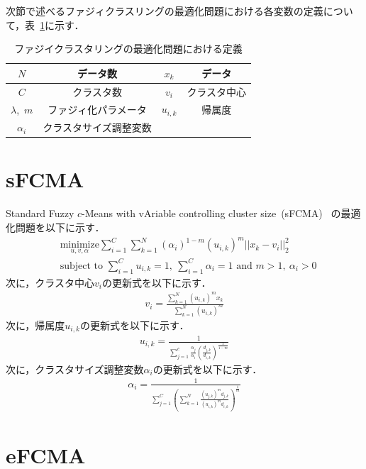 \documentclass[a4j,12pt,dvipdfmx,oneside]{jsbook}
\theoremstyle{definition}
\begin{document}
 次節で述べるファジィクラスリングの最適化問題における各変数の定義について，表~\ref{tab:fuzzy_c_define}に示す．
 \begin{table}[htbp]
  \caption{ファジイクラスタリングの最適化問題における定義}
  \begin{center}
   \begin{tabular}{c|c||c|c} \hline
    {$N$}&データ数&{$x_k$}&データ \\ \hline
    {$C$}&クラスタ数&{$v_i$}&クラスタ中心\\ \hline
    {$\lambda$,~$m$}&ファジィ化パラメータ&{$u_{i,k}$}&帰属度 \\ \hline
    {$\alpha_i$}&クラスタサイズ調整変数\\ \hline
   \end{tabular}
  \end{center}
  \label{tab:fuzzy_c_define}
 \end{table}

 \section{sFCMA}\label{sec:sfcma}
 
 Standard Fuzzy $c$-Means with vAriable controlling cluster size~(sFCMA)~\cite{sFCMA}
 の最適化問題を以下に示す．
 \begin{align}
  &\underset{u,v,\alpha}{\text{minimize}}
  \sum_{i=1}^C\sum_{k=1}^N(\alpha_{i})^{1-m}(u_{i,k})^m||x_k-v_i||_2^2\\
  &{\text{subject to }}\sum_{i=1}^Cu_{i,k}=1,~\sum_{i=1}^C\alpha_{i}=1{\text{ and }}m>1,~\alpha_{i}>0
 \end{align}
 次に，クラスタ中心$v_{i}$の更新式を以下に示す．
 \begin{align}
  v_{i}=\frac{\sum_{k=1}^N(u_{i,k})^mx_{k}}{\quad\sum_{k=1}^N(u_{i,k})^{m}}
 \end{align}
 次に，帰属度$u_{i,k}$の更新式を以下に示す．
 \begin{align}
  u_{i,k}=\frac{1}{\sum_{j=1}^c\frac{\alpha_{j}}{\alpha_{i}}\left(\frac{d_{j,k}}{d_{i,k}}\right)^\frac{1}{1-m}}
 \end{align}
 次に，クラスタサイズ調整変数$\alpha_{i}$の更新式を以下に示す．
 \begin{align}
  \alpha_{i}=\frac{1}{\sum_{j=1}^C\left(\sum_{k=1}^N\frac{(u_{j,k})^md_{j,k}}{(u_{i,k})^md_{i,k}}\right)^{\frac{1}{m}}}
 \end{align}

 \section{eFCMA}\label{sec:efcma}
\end{document}
